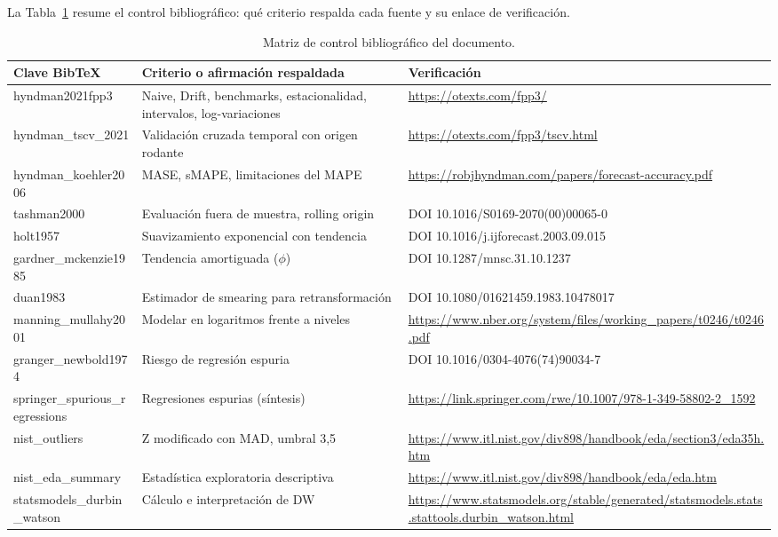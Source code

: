 \documentclass[12pt]{article}
\begin{document}


La Tabla~\ref{tab:control_biblio} resume el control bibliogr\'afico: qu\'e criterio respalda cada fuente y su enlace de verificaci\'on.

\begin{table}[H]
\centering
\caption{Matriz de control bibliogr\'afico del documento.}
\label{tab:control_biblio}
\scriptsize
\begin{adjustbox}{max width=\textwidth}
\begin{tabular}{@{}p{3.6cm}p{5.2cm}p{7.2cm}@{}}
\toprule
\textbf{Clave BibTeX} & \textbf{Criterio o afirmaci\'on respaldada} & \textbf{Verificaci\'on} \\
\midrule
hyndman2021fpp3 & Naive, Drift, benchmarks, estacionalidad, intervalos, log-variaciones & \url{https://otexts.com/fpp3/} \\
hyndman\_tscv\_2021 & Validaci\'on cruzada temporal con origen rodante & \url{https://otexts.com/fpp3/tscv.html} \\
hyndman\_koehler2006 & MASE, sMAPE, limitaciones del MAPE & \url{https://robjhyndman.com/papers/forecast-accuracy.pdf} \\
tashman2000 & Evaluaci\'on fuera de muestra, rolling origin & DOI 10.1016/S0169-2070(00)00065-0 \\
holt1957 & Suavizamiento exponencial con tendencia & DOI 10.1016/j.ijforecast.2003.09.015 \\
gardner\_mckenzie1985 & Tendencia amortiguada ($\phi$) & DOI 10.1287/mnsc.31.10.1237 \\
duan1983 & Estimador de smearing para retransformaci\'on & DOI 10.1080/01621459.1983.10478017 \\
manning\_mullahy2001 & Modelar en logaritmos frente a niveles & \url{https://www.nber.org/system/files/working_papers/t0246/t0246.pdf} \\
granger\_newbold1974 & Riesgo de regresi\'on espuria & DOI 10.1016/0304-4076(74)90034-7 \\
springer\_spurious\_regressions & Regresiones espurias (s\'intesis) & \url{https://link.springer.com/rwe/10.1007/978-1-349-58802-2_1592} \\
nist\_outliers & Z modificado con MAD, umbral 3,5 & \url{https://www.itl.nist.gov/div898/handbook/eda/section3/eda35h.htm} \\
nist\_eda\_summary & Estad\'istica exploratoria descriptiva & \url{https://www.itl.nist.gov/div898/handbook/eda/eda.htm} \\
statsmodels\_durbin\_watson & C\'alculo e interpretaci\'on de DW & \url{https://www.statsmodels.org/stable/generated/statsmodels.stats.stattools.durbin_watson.html} \\

\end{tabular}
\end{adjustbox}
\end{table}
\end{document}
